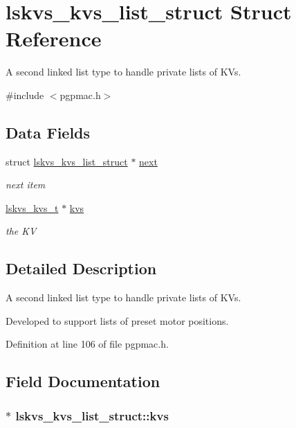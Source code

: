 \hypertarget{structlskvs__kvs__list__struct}{\section{lskvs\-\_\-kvs\-\_\-list\-\_\-struct Struct Reference}
\label{structlskvs__kvs__list__struct}
}


A second linked list type to handle private lists of K\-Vs.  




{\ttfamily \#include $<$pgpmac.\-h$>$}

\subsection*{Data Fields}
\begin{DoxyCompactItemize}
\item 
struct \hyperlink{structlskvs__kvs__list__struct}{lskvs\-\_\-kvs\-\_\-list\-\_\-struct} $\ast$ \hyperlink{structlskvs__kvs__list__struct_aa3ed4d35bdda99bb1c08793633579edc}{next}
\begin{DoxyCompactList}\small\item\em next item \end{DoxyCompactList}\item 
\hyperlink{pgpmac_8h_a54bd386f945edb8a0311a20199e8f793}{lskvs\-\_\-kvs\-\_\-t} $\ast$ \hyperlink{structlskvs__kvs__list__struct_a7f5620fa24157783bb02e6dd82bdcb22}{kvs}
\begin{DoxyCompactList}\small\item\em the K\-V \end{DoxyCompactList}\end{DoxyCompactItemize}


\subsection{Detailed Description}
A second linked list type to handle private lists of K\-Vs. 

Developed to support lists of preset motor positions. 

Definition at line 106 of file pgpmac.\-h.



\subsection{Field Documentation}
\hypertarget{structlskvs__kvs__list__struct_a7f5620fa24157783bb02e6dd82bdcb22}{
\subsubsection[{kvs}]{$\ast$ lskvs\-\_\-kvs\-\_\-list\-\_\-struct\-::kvs}}\label{structlskvs__kvs__list__struct_a7f5620fa24157783bb02e6dd82bdcb22}


